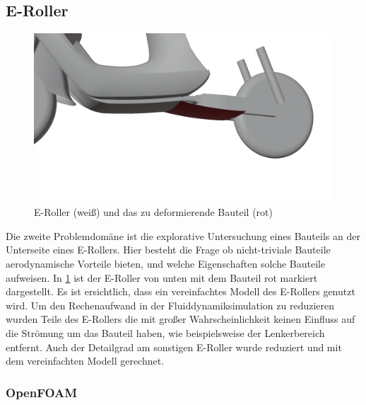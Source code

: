 \subsection{E-Roller}
\label{sub:method_escooter}
\begin{figure}[h]
	\centering
	\includegraphics[width=.8\linewidth]{bilder/escooter_component}
	\caption{E-Roller (weiß) und das zu deformierende Bauteil (rot)}
	\label{fig:escooter_component}
\end{figure}

Die zweite Problemdomäne ist die explorative Untersuchung eines Bauteils an der Unterseite eines E-Rollers.
Hier besteht die Frage ob nicht-triviale Bauteile aerodynamische Vorteile bieten, und welche Eigenschaften solche Bauteile aufweisen.
In \cref{fig:escooter_component} ist der E-Roller von unten mit dem Bauteil rot markiert dargestellt.
Es ist ersichtlich, dass ein vereinfachtes Modell des E-Rollers genutzt wird.
Um den Rechenaufwand in der Fluiddynamiksimulation zu reduzieren wurden Teile des E-Rollers die mit großer Wahrscheinlichkeit keinen Einfluss auf die Strömung um das Bauteil haben, wie beispielsweise der Lenkerbereich entfernt.
Auch der Detailgrad am sonstigen E-Roller wurde reduziert und mit dem vereinfachten Modell gerechnet.

\subsubsection{OpenFOAM}


